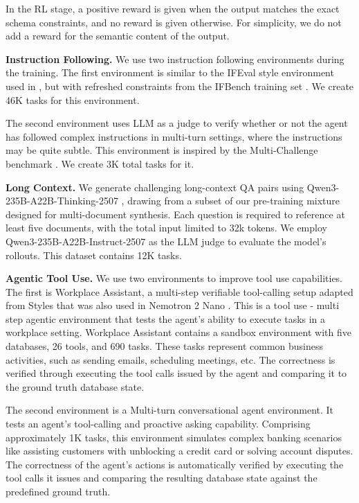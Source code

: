 In the RL stage, a positive reward is given when the output matches the exact schema constraints, and no reward is given otherwise. For simplicity, we do not add a reward for the semantic content of the output.

\textbf{Instruction Following.} We use two instruction following environments during the training. The first environment is similar to the IFEval style environment used in \citet{bercovich2025llamanemotronefficientreasoningmodels}, but with refreshed constraints from the IFBench training set \citep{pyatkin2025generalizing}. We create 46K tasks for this environment.

The second environment uses LLM as a judge to verify whether or not the agent has followed complex instructions in multi-turn settings, where the instructions may be quite subtle. This environment is inspired by the Multi-Challenge benchmark \citep{deshpande2025multichallenge}. We create 3K total tasks for it.

\textbf{Long Context.}
We generate challenging long-context QA pairs using Qwen3-235B-A22B-Thinking-2507 \citep{yang2025qwen3technicalreport}, drawing from a subset of our pre-training mixture designed for multi-document synthesis. Each question is required to reference at least five documents, with the total input limited to 32k tokens. We employ Qwen3-235B-A22B-Instruct-2507 \citep{yang2025qwen3technicalreport} as the LLM judge to evaluate the model's rollouts. This dataset contains 12K tasks.

\textbf{Agentic Tool Use.} We use two environments to improve tool use capabilities. The first is Workplace Assistant, a multi-step verifiable tool-calling setup adapted from Styles \citep{Styles2024WorkBench} that was also used in Nemotron 2 Nano \citep{nemotronnanov2}. This is a tool use - multi step agentic environment that tests the agent's ability to execute tasks in a workplace setting. Workplace Assistant contains a sandbox environment with five databases, 26 tools, and 690 tasks. These tasks represent common business activities, such as sending emails, scheduling meetings, etc. The correctness is verified through executing the tool calls issued by the agent and comparing it to the ground truth database state. 

The second environment is a Multi-turn conversational agent environment. It tests an agent's tool-calling and proactive asking capability. Comprising approximately 1K tasks, this environment simulates complex banking scenarios like assisting customers with unblocking a credit card or solving account disputes. The correctness of the agent's actions is automatically verified by executing the tool calls it issues and comparing the resulting database state against the predefined ground truth.



